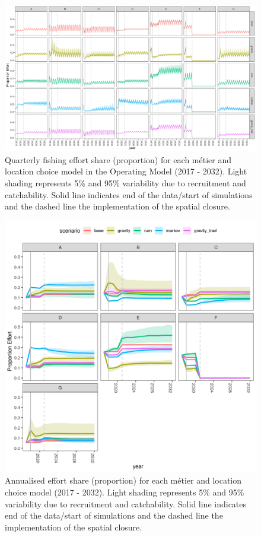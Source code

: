 \documentclass[12pt, halfline, a4paper]{ouparticle}
\begin{document}
\newpage

\begin{figure}
	\centering
	\includegraphics[width=1\linewidth]{figures/Effort_shares}
	\caption{Quarterly fishing effort share (proportion) for each métier
		and location choice model in the Operating Model (2017 - 2032).
		Light shading represents 5\% and 95\% variability due to
		recruitment and catchability. Solid line indicates end of the
		data/start of simulations and the dashed line the
		implementation of the spatial closure.} 
	\label{fig:effort}
\end{figure}	

\newpage

\begin{figure}[!ht]
	\centering
	\includegraphics[width=1\linewidth]{figures/Effort_shares_annual}
	\caption{Annualised effort share (proportion) for each métier
		and location choice model (2017 - 2032). Light shading
		represents 5\% and 95\% variability due to recruitment and
		catchability. Solid line indicates end of the data/start of
		simulations and the dashed line the implementation of the
		spatial closure.} 
	\label{fig:effort_an}
\end{figure}	
\end{document}
